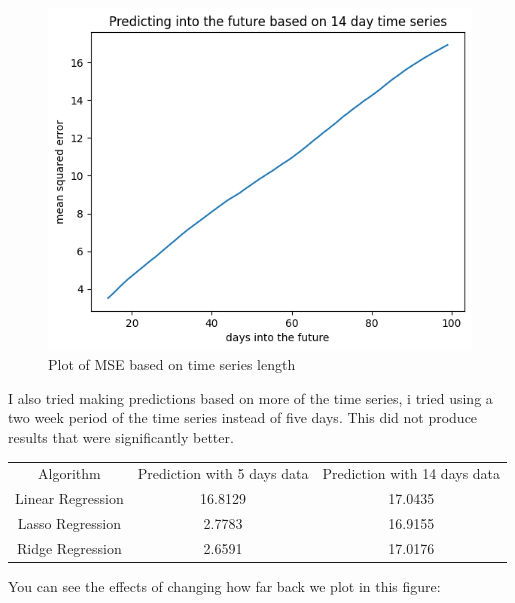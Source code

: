 \documentclass{report}
\begin{document}
\begin{figure}
    \caption{Plot of MSE based on time series length}
    \centering
    \includegraphics[scale=0.5]{predicting_into_future_plot.png}
\end{figure}

I also tried making predictions based on more of the time series, i tried using a two week period of the time series instead of five days. This did not produce results that were significantly better.

\begin{minipage} {\linewidth}
\bigskip
\centering
{}
\begin{tabular}{c c c}
    Algorithm & Prediction with 5 days data & Prediction with 14 days data \\
    Linear Regression & 16.8129 & 17.0435\\
    Lasso Regression & 2.7783 & 16.9155\\
    Ridge Regression & 2.6591 & 17.0176
\end{tabular}
\bigskip
\end{minipage}

You can see the effects of changing how far back we plot in this figure:
\end{document}
